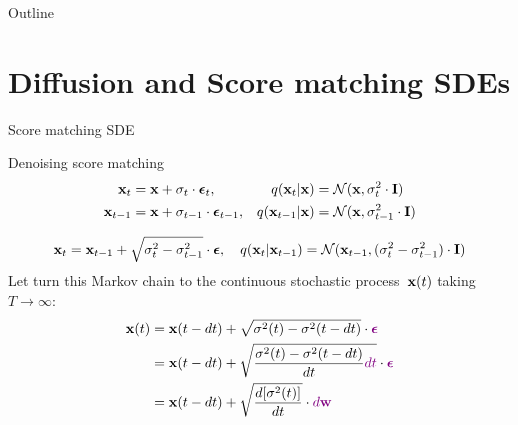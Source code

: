 \begin{frame}{Outline}
	\tableofcontents
\end{frame}
\section{Diffusion and Score matching SDEs}
\begin{frame}{Score matching SDE}
	\vspace{-0.3cm}
	\begin{block}{Denoising score matching}
		\vspace{-0.7cm}
		\begin{align*}
			\mathbf{x}_t &= \mathbf{x} + \sigma_t \cdot \boldsymbol{\epsilon}_t, & q(\mathbf{x}_t | \mathbf{x}) &= \mathcal{N}(\mathbf{x}, \sigma_t^2 \cdot \mathbf{I}) \\
			\mathbf{x}_{t-1} &= \mathbf{x} + \sigma_{t-1} \cdot \boldsymbol{\epsilon}_{t-1}, & q(\mathbf{x}_{t-1} | \mathbf{x}) &= \mathcal{N}(\mathbf{x}, \sigma_{t-1}^2 \cdot \mathbf{I})
		\end{align*}
	\end{block}
	\vspace{-1.0cm}
	\[
		\mathbf{x}_t = \mathbf{x}_{t - 1} + \sqrt{\sigma^2_t - \sigma^2_{t-1}} \cdot \boldsymbol{\epsilon}, \quad q(\mathbf{x}_{t} | \mathbf{x}_{t-1}) = \mathcal{N}(\mathbf{x}_{t-1}, (\sigma_t^2 - \sigma_{t-1}^2) \cdot \mathbf{I})
	\]
	Let turn this Markov chain to the continuous stochastic process~$\mathbf{x}(t)$ taking $T \rightarrow \infty$:
	\vspace{-0.3cm}
	\begin{align*}
		\mathbf{x}(t) &= \mathbf{x}(t - dt) + \sqrt{\sigma^2(t) - \sigma^2(t - dt)} \cdot {\color{violet}\boldsymbol{\epsilon}} \\
		&= \mathbf{x}(t - dt) + \sqrt{\frac{\sigma^2(t) - \sigma^2(t - dt)}{dt} {\color{violet}dt}} \cdot {\color{violet}\boldsymbol{\epsilon}} \\
		&= \mathbf{x}(t - dt) + \sqrt{\frac{ d [\sigma^2(t)]}{dt}} \cdot {\color{violet}d \mathbf{w}}
	\end{align*}
	\vspace{-0.5cm}
\end{frame}
